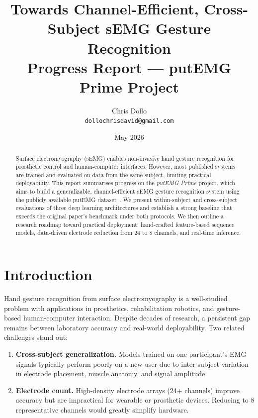 \documentclass[11pt,twocolumn]{article}
\title{\textbf{Towards Channel-Efficient, Cross-Subject sEMG Gesture Recognition}\\
       \large Progress Report — putEMG Prime Project}
\author{Chris Dollo\\
        \small \texttt{dollochrisdavid@gmail.com}}
\date{May 2026}
\begin{document}
\maketitle

\begin{abstract}
Surface electromyography (sEMG) enables non-invasive hand gesture recognition for
prosthetic control and human-computer interfaces. However, most published systems
are trained and evaluated on data from the same subject, limiting practical
deployability. This report summarises progress on the \emph{putEMG Prime} project,
which aims to build a generalizable, channel-efficient sEMG gesture recognition
system using the publicly available putEMG dataset~\cite{kaczmarek2019putemg}.
We present within-subject and cross-subject evaluations of three deep learning
architectures and establish a strong baseline that exceeds the original
paper's benchmark under both protocols. We then outline a research roadmap
toward practical deployment: hand-crafted feature-based sequence models,
data-driven electrode reduction from 24 to 8 channels, and real-time inference.
\end{abstract}

\section{Introduction}

Hand gesture recognition from surface electromyography is a well-studied problem
with applications in prosthetics, rehabilitation robotics, and gesture-based
human-computer interaction. Despite decades of research, a persistent gap remains
between laboratory accuracy and real-world deployability. Two related challenges
stand out:

\begin{enumerate}[noitemsep]
  \item \textbf{Cross-subject generalization.} Models trained on one participant's
        EMG signals typically perform poorly on a new user due to inter-subject
        variation in electrode placement, muscle anatomy, and signal amplitude.
  \item \textbf{Electrode count.} High-density electrode arrays (24+ channels)
        improve accuracy but are impractical for wearable or prosthetic devices.
        Reducing to 8 representative channels would greatly simplify hardware.
\end{enumerate}
\end{document}
